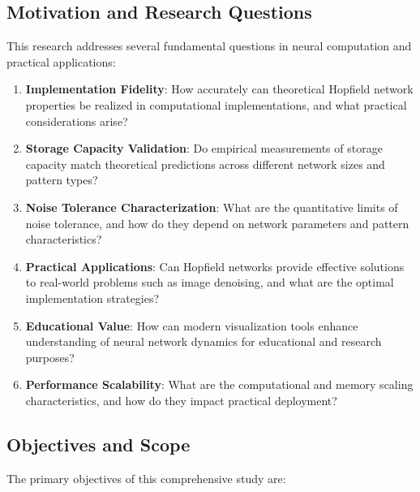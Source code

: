 \documentclass[11pt,a4paper]{article}
\begin{document}
\subsection{Motivation and Research Questions}

This research addresses several fundamental questions in neural computation and practical applications:

\begin{enumerate}
    \item \textbf{Implementation Fidelity}: How accurately can theoretical Hopfield network properties be realized in computational implementations, and what practical considerations arise?
    
    \item \textbf{Storage Capacity Validation}: Do empirical measurements of storage capacity match theoretical predictions across different network sizes and pattern types?
    
    \item \textbf{Noise Tolerance Characterization}: What are the quantitative limits of noise tolerance, and how do they depend on network parameters and pattern characteristics?
    
    \item \textbf{Practical Applications}: Can Hopfield networks provide effective solutions to real-world problems such as image denoising, and what are the optimal implementation strategies?
    
    \item \textbf{Educational Value}: How can modern visualization tools enhance understanding of neural network dynamics for educational and research purposes?
    
    \item \textbf{Performance Scalability}: What are the computational and memory scaling characteristics, and how do they impact practical deployment?
\end{enumerate}

\subsection{Objectives and Scope}

The primary objectives of this comprehensive study are:
\end{document}
